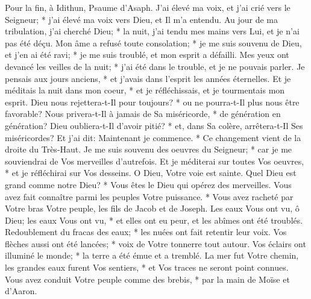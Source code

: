 Pour la fin, à Idithun, Psaume d'Asaph.
J'ai élevé ma voix, et j'ai crié vers le Seigneur; * j'ai élevé ma voix vers Dieu, et Il m'a entendu.
Au jour de ma tribulation, j'ai cherché Dieu; * la nuit, j'ai tendu mes mains vers Lui, et je n'ai pas été déçu. Mon âme a refusé toute consolation; *
je me suis souvenu de Dieu, et j'en ai été ravi; * je me suis troublé, et mon esprit a défailli.
Mes yeux ont devancé les veilles de la nuit; * j'ai été dans le trouble, et je ne pouvais parler.
Je pensais aux jours anciens, * et j'avais dans l'esprit les années éternelles.
Et je méditais la nuit dans mon coeur, * et je réfléchissais, et je tourmentais mon esprit.
Dieu nous rejettera-t-Il pour toujours? * ou ne pourra-t-Il plus nous être favorable?
Nous privera-t-Il à jamais de Sa miséricorde, * de génération en génération?
Dieu oubliera-t-Il d'avoir pitié? * et, dans Sa colère, arrêtera-t-Il Ses miséricordes?
Et j'ai dit: Maintenant je commence. * Ce changement vient de la droite du Très-Haut.
Je me suis souvenu des oeuvres du Seigneur; * car je me souviendrai de Vos merveilles d'autrefois.
Et je méditerai sur toutes Vos oeuvres, * et je réfléchirai sur Vos desseins.
O Dieu, Votre voie est sainte. Quel Dieu est grand comme notre Dieu? *
Vous êtes le Dieu qui opérez des merveilles. Vous avez fait connaître parmi les peuples Votre puissance. *
Vous avez racheté par Votre bras Votre peuple, les fils de Jacob et de Joseph.
Les eaux Vous ont vu, ô Dieu; les eaux Vous ont vu, * et elles ont eu peur, et les abîmes ont été troublés.
Redoublement du fracas des eaux; * les nuées ont fait retentir leur voix. Vos flèches aussi ont été lancées; *
voix de Votre tonnerre tout autour. Vos éclairs ont illuminé le monde; * la terre a été émue et a tremblé.
La mer fut Votre chemin, les grandes eaux furent Vos sentiers, * et Vos traces ne seront point connues.
Vous avez conduit Votre peuple comme des brebis, * par la main de Moïse et d'Aaron.

